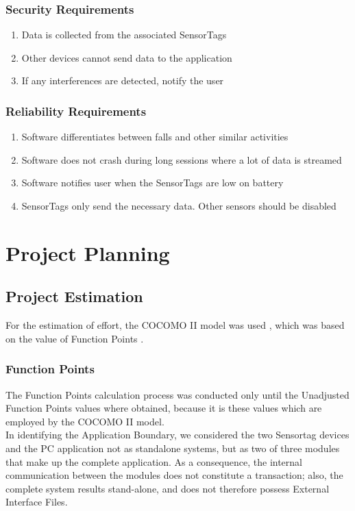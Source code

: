 \documentclass[conference,12pt]{IEEETran}
\begin{document}
\subsubsection{Security Requirements}

\begin{enumerate}
	\item Data is collected from the associated SensorTags
	\item Other devices cannot send data to the application
	\item If any interferences are detected, notify the user
\end{enumerate}


\subsubsection{Reliability Requirements}

\begin{enumerate}
	\item Software differentiates between falls and other similar activities
	\item Software does not crash during long sessions where a lot of data is streamed
	\item Software notifies user when the SensorTags are low on battery
	\item SensorTags only send the necessary data. Other sensors should be disabled
\end{enumerate}

\section{Project Planning}

\subsection{Project Estimation}
For the estimation of effort, the COCOMO II model was used \cite{cocomo}, which was based on the value of Function Points \cite{albrecht}.\\

\subsubsection{Function Points}
The Function Points calculation process was conducted only until the Unadjusted Function Points values where obtained, because it is these values which are employed by the COCOMO II model.\\
In identifying the Application Boundary, we considered the two Sensortag devices and the PC application not as standalone systems, but as two of three modules that make up the complete application. As a consequence, the internal communication between the modules does not constitute a transaction; also, the complete system results stand-alone, and does not therefore possess External Interface Files.\\
\end{document}
